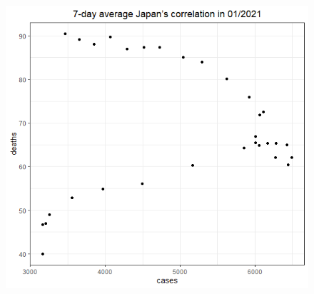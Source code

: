 \documentclass[english,10pt,table]{beamer}
\begin{document}
{\begin{figure}[H]
\begin{center}
        \includegraphics[scale = 0.2]{ix/ix.3/JPN_01_2021.png}
        

\end{center}
\end{figure}}
\end{document}
